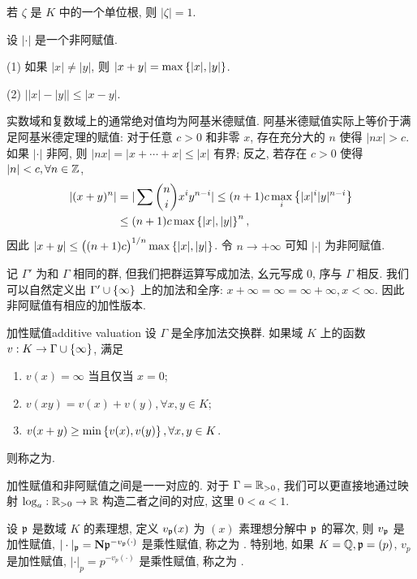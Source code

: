 \begin{exercise}
若 $\zeta$ 是 $K$ 中的一个单位根, 则 $|\zeta|=1$.
\end{exercise}

\begin{exercise}
设 $|\cdot|$ 是一个非阿赋值.

(1) 如果 $|x|\neq |y|$, 则 $|x+y|=\max\left\{|x|,|y|\right\}$.

(2) $\bigl||x|-|y|\bigr|\le|x-y|$.
\end{exercise}

实数域和复数域上的通常绝对值均为阿基米德赋值.
阿基米德赋值实际上等价于满足阿基米德定理的赋值: 对于任意 $c>0$ 和非零 $x$, 存在充分大的 $n$ 使得 $|nx|>c$.
如果 $|\cdot|$ 非阿, 则 $|nx|=|x+\cdots+x|\le|x|$ 有界; 反之, 若存在 $c>0$ 使得 $|n|<c,\forall n\in {\mathbb{Z}}$, 
  \[\begin{split}
|(x+y)^n|&=|\sum{n\choose i}x^i y^{n-i}|\le (n+1)c\max_i \left\{|x|^i|y|^{n-i}\right\}\\
&\le (n+1)c\max\left\{|x|,|y|\right\}^n,
\end{split}\]
因此 $|x+y|\le \big((n+1)c\big)^{1/n}\max\left\{|x|,|y|\right\}$.
令 $n\to +\infty$ 可知 $|\cdot|$ 为非阿赋值.

记 $\Gamma'$ 为和 $\Gamma$ 相同的群, 但我们把群运算写成加法, 幺元写成 $0$, 序与 $\Gamma$ 相反. 我们可以自然定义出 $\Gamma'\cup\left\{\infty\right\}$ 上的加法和全序: $x+\infty=\infty=\infty+\infty,x<\infty$.
因此非阿赋值有相应的加性版本.

\begin{definition}{加性赋值}{additive valuation}
设 $\Gamma$ 是全序加法交换群.
如果域 $K$ 上的函数 $v:K\to \Gamma\cup\left\{\infty\right\}$, 满足
\begin{enumerate}[(1)]
\item $v(x)=\infty$ 当且仅当 $x=0$;
\item $v(xy)=v(x)+v(y),\forall x,y\in K$;
\item $v(x+y)\ge\min\left\{v(x),v(y)\right\},\forall x,y\in K$.
\end{enumerate}
则称之为.
\end{definition}

加性赋值和非阿赋值之间是一一对应的. 对于 $\Gamma={\mathbb{R}}_{>0}$, 我们可以更直接地通过映射 $\log_a:{\mathbb{R}}_{>0}\to {\mathbb{R}}$ 构造二者之间的对应, 这里 $0<a<1$.

\begin{exercise}
设 ${\mathfrak{p}}$ 是数域 $K$ 的素理想, 定义 $v_{\mathfrak{p}}(x)$ 为 $(x)$ 素理想分解中 ${\mathfrak{p}}$ 的幂次, 则 $v_{\mathfrak{p}}$ 是加性赋值, $|\cdot|_{\mathfrak{p}}={\mathbf{N}}{\mathfrak{p}}^{-v_{\mathfrak{p}}(\cdot)}$ 是乘性赋值, 称之为 . 特别地, 如果 $K={\mathbb{Q}},{\mathfrak{p}}=(p)$, $v_p$ 是加性赋值, $|\cdot|_p=p^{-v_p(\cdot)}$ 是乘性赋值, 称之为 .
\end{exercise}

